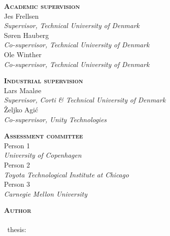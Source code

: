 

\thispagestyle{empty} %

\hfill\vfill

\noindent
\small%
\textsc{\textbf{Academic supervision}}
\medskip
\\Jes Frellsen\\
\textit{Supervisor, Technical University of Denmark}
\medskip
\\Søren Hauberg\\
\textit{Co-supervisor, Technical University of Denmark}
\medskip
\\Ole Winther\\
\textit{Co-supervisor, Technical University of Denmark}
\medskip

\bigskip
\noindent
\textsc{\textbf{Industrial supervision}}
\medskip
\\Lars Maaløe\\
\textit{Supervisor, Corti \& Technical University of Denmark}
\medskip
\\Željko Agi\'c\\
\textit{Co-supervisor, Unity Technologies}
\medskip

\bigskip
\noindent
\textsc{\textbf{Assessment committee}}
\medskip
\\Person 1\\
\textit{University of Copenhagen}
\medskip
\\Person 2\\
\textit{Toyota Technological Institute at Chicago}
\medskip
\\Person 3\\
\textit{Carnegie Mellon University}
\medskip

\bigskip
\noindent
\textsc{\textbf{Author}}
\medskip
\\\thesisauthor\\
\thesistypeabbr\ thesis:\\
\textit{\thesistitle}\\
\textcopyright\ \thesismonth\ \thesisyear

\normalsize
\normalfont
